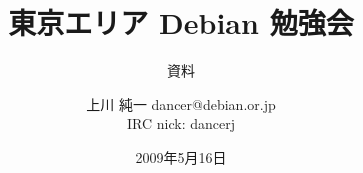




\documentclass[cjk,dvipdfmx,12pt]{beamer}
\usepackage{monthlypresentation}



\title{東京エリア Debian 勉強会}
\subtitle{資料}
\author{上川 純一 dancer@debian.or.jp\\IRC nick: dancerj}
\date{2009年5月16日}




